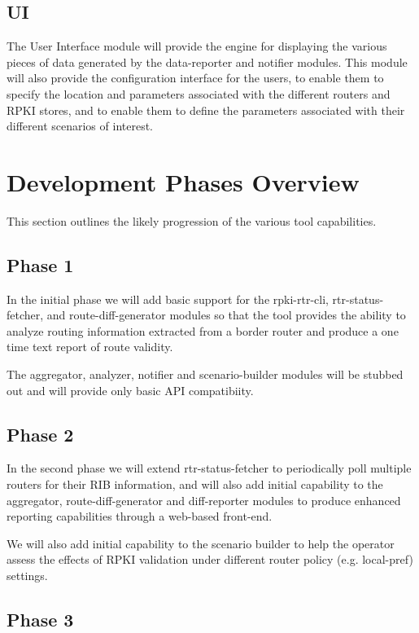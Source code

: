 \subsection{UI}

The User Interface module will provide the engine for displaying the
various pieces of data generated by the data-reporter and notifier
modules. This module will also provide the configuration interface for
the users, to enable them to specify the location and parameters
associated with the different routers and RPKI stores, and to enable them
to define the parameters associated with their different scenarios of
interest.


\section{Development Phases Overview}

This section outlines the likely progression of the various tool
capabilities.

\subsection{Phase 1}

In the initial phase we will add basic support for the
rpki-rtr-cli, rtr-status-fetcher, and route-diff-generator modules so
that the tool provides the ability to analyze routing information
extracted from a border router and produce a one time text report of
route validity.

The aggregator, analyzer, notifier and scenario-builder modules will
be stubbed out and will provide only basic API compatibiity. 

\subsection{Phase 2}

In the second phase we will extend rtr-status-fetcher to periodically poll
multiple routers for their RIB information, and will also add initial
capability to the aggregator, route-diff-generator and diff-reporter modules
to produce enhanced reporting capabilities through a web-based
front-end.

We will also add initial capability to the scenario builder to
help the operator assess the effects of RPKI validation under 
different router policy (e.g. local-pref) settings. 

\subsection{Phase 3}

